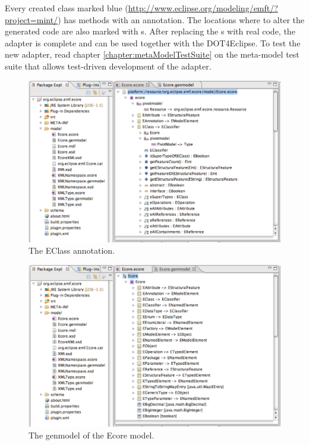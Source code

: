 Every created class marked blue (\url{http://www.eclipse.org/modeling/emft/?project=mint/}) has methods with an  annotation. The locations where to alter the generated code are also marked with s. After replacing the s with real code, the adapter is complete and can be used together with the \acl{DOT4Eclipse}. To test the new adapter, read chapter \ref{chapter:metaModelTestSuite} on the meta-model test suite that allows test-driven development of the adapter.

\begin{figure}[!htbp]
	\centering
	\includegraphics[width=1.0\linewidth]{figures/pivotModelAdaption/EClassAnnotation}
	\caption{The EClass annotation.}
	\label{pic:pivotModelAdaption:EClassAnnotation}
\end{figure}

\begin{figure}[!htbp]
	\centering
	\includegraphics[width=1.0\linewidth]{figures/pivotModelAdaption/EcoreGenModel}
	\caption{The genmodel of the Ecore model.}
	\label{pic:pivotModelAdaption:EcoreGenModel}
\end{figure}

